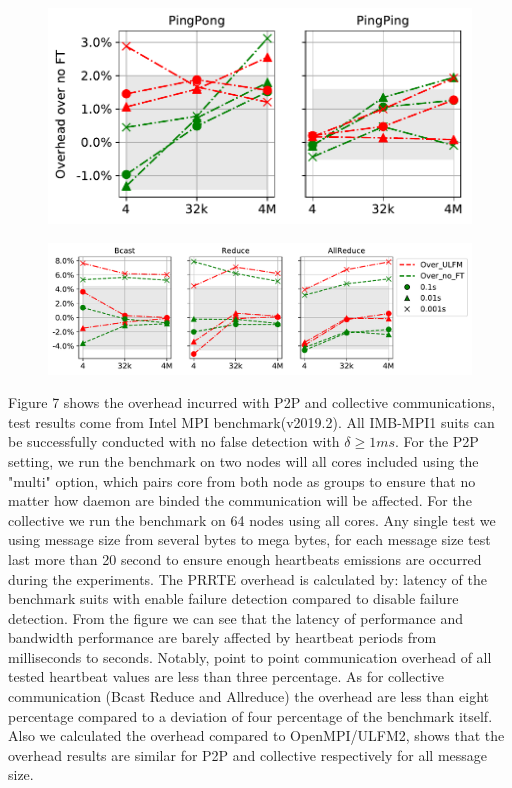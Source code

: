 \documentclass[sigconf]{acmart}
\begin{document}
\begin{figure}[h]
\centering
\begin{minipage}{.38\textwidth}
  \centering
  \includegraphics[width=\linewidth]{multi_pingping_pingpong_overhead.pdf}
  \label{fig:Ring}
\end{minipage}%
\begin{minipage}{.62\textwidth}
  \centering
  \includegraphics[width=\linewidth]{Bcast_overhead_with_ulfm_max_col.pdf}
  \label{fig:Reconnect Ring}
\end{minipage}
\end{figure}

Figure 7 shows the overhead incurred with P2P and collective communications, test results come from Intel MPI benchmark(v2019.2). All IMB-MPI1 suits can be successfully conducted with no false detection with $ \delta \geq 1 ms $. For the P2P setting, we run the benchmark on two nodes will all cores included using the "multi" option, which pairs core from both node as groups to ensure that no matter how daemon are binded the communication will be affected. For the collective we run the benchmark on 64 nodes using all cores. Any single test we using message size from several bytes to mega bytes, for each message size test last more than 20 second to ensure enough heartbeats emissions are occurred during the experiments. The PRRTE overhead is calculated by: latency of the benchmark suits with enable failure detection compared to disable failure detection. From the figure we can see that the latency of performance and bandwidth performance are barely affected by heartbeat periods from milliseconds to seconds. Notably, point to point communication overhead of all tested heartbeat values are less than three percentage. As for collective communication (Bcast Reduce and Allreduce) the overhead are less than eight percentage compared to a deviation of four percentage of the benchmark itself. Also we calculated the overhead compared to OpenMPI/ULFM2, shows that the overhead results are similar for P2P and collective respectively for all message size.
\end{document}
